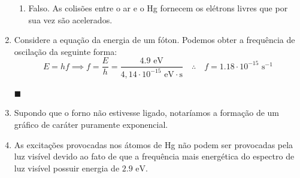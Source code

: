 \documentclass[12pt,a4paper]{article}
\begin{document}
\begin{enumerate}[label = \alph*)]
\begin{enumerate}
        \item Falso. As colisões entre o ar e o Hg fornecem os elétrons livres que por sua vez são acelerados.
    \end{enumerate}
    


    
    \item Considere a equação da energia de um fóton. Podemos obter a frequência de oscilação da seguinte forma:
    \begin{equation}\label{eq:Atv7f-1}
        E=hf\implies f=\frac{E}{h}=\frac{4.9\text{ eV}}{4,14\cdot10^{-15}\text{ eV}\cdot\text{s}}\quad\therefore\quad\boxed{f=1.18\cdot10^{-15}\text{ s}^{-1}}
    \end{equation}
    \begin{flushright}
        $\blacksquare$
    \end{flushright}

    
    
    \item Supondo que o forno não estivesse ligado, notaríamos a formação de um gráfico de caráter puramente exponencial.
    

    
    \item As excitações provocadas nos átomos de Hg não podem ser provocadas pela luz visível devido ao fato de que a frequência mais energética do espectro de luz visível possuir energia de $2.9\text{ eV}$.
\end{enumerate}



\noindent\makebox[\linewidth]{\rule{\paperwidth}{0.4pt}}
\newpage
\end{document}
